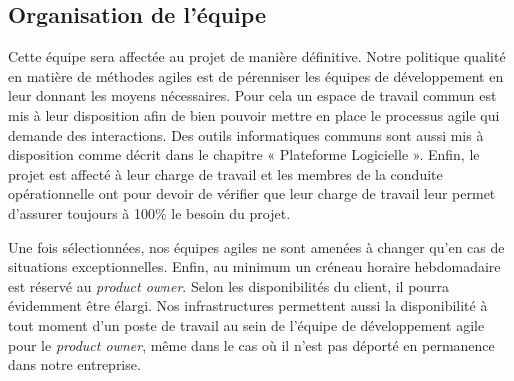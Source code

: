 \subsection{Organisation de l'équipe}
Cette équipe sera affectée au projet de manière définitive. Notre politique qualité en matière de méthodes agiles est de pérenniser les équipes de développement en leur donnant les moyens nécessaires. Pour cela un espace de travail commun est mis à leur disposition afin de bien pouvoir mettre en place le processus agile qui demande des interactions. Des outils informatiques communs sont aussi mis à disposition comme décrit dans le chapitre « Plateforme Logicielle ». Enfin, le projet est affecté à leur charge de travail et les membres de la conduite opérationnelle ont pour devoir de vérifier que leur charge de travail leur permet d’assurer toujours à 100\% le besoin du projet. 

Une fois sélectionnées, nos équipes agiles ne sont amenées à changer qu’en cas de situations exceptionnelles. Enfin, au minimum un créneau horaire hebdomadaire est réservé au \textit{product owner}. Selon les disponibilités du client, il pourra évidemment être élargi. Nos infrastructures permettent aussi la disponibilité à tout moment d’un poste de travail au sein de l’équipe de développement agile pour le \textit{product owner}, même dans le cas où il n’est pas déporté en permanence dans notre entreprise.  